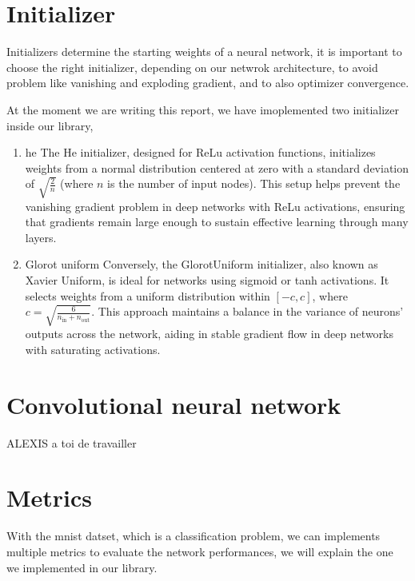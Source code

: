 \documentclass[a4paper, twocolumn, twoside]{article}
\begin{document}
	\section{Initializer}
	Initializers determine the starting weights of a neural network, it is important to choose the right initializer, depending
	on our netwrok architecture, to avoid problem like vanishing and exploding gradient, and to also optimizer convergence.

	At the moment we are writing this report, we have imoplemented two initializer inside our library,

	\begin{enumerate}
		\item{he}
	The He initializer, designed for ReLu activation functions,
	initializes weights from a normal distribution centered at zero with a standard deviation of 
	$\sqrt{\frac{2}{n}}$ (where $n$ is the number of input nodes).
	This setup helps prevent the vanishing gradient problem in deep networks with ReLu activations,
	ensuring that gradients remain large enough to sustain effective learning through many layers.
		\item{Glorot uniform}
	Conversely, the GlorotUniform initializer, 
	also known as Xavier Uniform, is ideal for networks using sigmoid or tanh activations.
	It selects weights from a uniform distribution within $[-c, c]$,
	where $c = \sqrt{\frac{6}{n_{\text{in}} + n_{\text{out}}}}$.
	This approach maintains a balance in the variance of neurons' outputs across the network,
	aiding in stable gradient flow in deep networks with saturating activations.
	\end{enumerate}

	\section{Convolutional neural network}
	ALEXIS a toi de travailler

	\section{Metrics}
	With the mnist datset, which is a classification problem, we can implements multiple metrics
	to evaluate the network performances, we will explain the one we implemented in our library.
\end{document}
